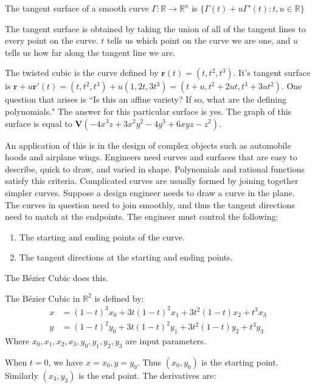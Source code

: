 \documentclass[crop=false,class=book]{standalone}
\begin{document}
\begin{definition}
The tangent surface of a smooth curve $\Gamma:\mathbb{R}\rightarrow \mathbb{R}^n$ is $\{\Gamma(t)+u\Gamma'(t):t,u\in \mathbb{R}\}$
\end{definition}
\begin{remark}
The tangent surface is obtained by taking the union of all of the tangent lines to every point on the curve. $t$ tells us which point on the curve we are one, and $u$ tells us how far along the tangent line we are.
\end{remark}
\begin{example}
The twisted cubic is the curve defined by $\mathbf{r}(t) = (t,t^2,t^3)$. It's tangent surface is $\mathbf{r}+u\mathbf{r}'(t)=(t,t^2,t^3)+u(1,2t,3t^3)=(t+u,t^2+2ut,t^3+3ut^2)$. One question that arises is ``Is this an affine variety? If so, what are the defining polynomials." The answer for this particular surface is yes. The graph of this surface is equal to $\mathbf{V}(-4x^3z+3x^2y^2-4y^3+6xyz-z^2)$.
\end{example}
An application of this is in the design of complex objects such as automobile hoods and airplane wings. Engineers need curves and surfaces that are easy to describe, quick to draw, and varied in shape. Polynomials and rational functions satisfy this criteria. Complicated curves are usually formed by joining together simpler curves. Suppose a design engineer needs to draw a curve in the plane. The curves in question need to join smoothly, and thus the tangent directions need to match at the endpoints. The engineer must control the following:
\begin{enumerate}
    \item The starting and ending points of the curve.
    \item The tangent directions at the starting and ending points.
\end{enumerate}
The B\'{e}zier Cubic does this.
\begin{definition}
The B\'{e}zier Cubic in $\mathbb{R}^2$ is defined by:
\begin{align*}
    x &= (1-t)^3 x_0+3t(1-t)^2x_1+3t^2(1-t)x_2+t^3x_3 \\
    y &= (1-t)^2 y_0+3t(1-t)^2y_1+3t^2(1-t)y_2+t^3y_3
\end{align*}
Where $x_0,x_1,x_2,x_3,y_0,y_1,y_2,y_3$ are input parameters.
\end{definition}
When $t=0$, we have $x = x_0, y=y_0$. Thus $(x_0,y_0)$ is the starting point. Similarly $(x_3,y_3)$ is the end point. The derivatives are:
\end{document}
